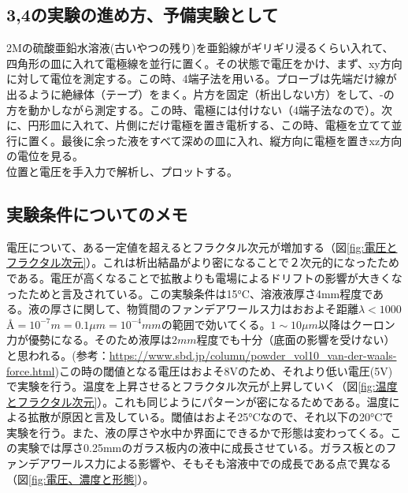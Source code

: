 \documentclass{ltjsarticle}
\begin{document}
\subsection{3,4の実験の進め方、予備実験として}
2Mの硫酸亜鉛水溶液(古いやつの残り)を亜鉛線がギリギリ浸るくらい入れて、四角形の皿に入れて電極線を並行に置く。その状態で電圧をかけ、まず、xy方向に対して電位を測定する。この時、4端子法を用いる。プローブは先端だけ線が出るように絶縁体（テープ）をまく。片方を固定（析出しない方）をして、-の方を動かしながら測定する。この時、電極には付けない（4端子法なので）。次に、円形皿に入れて、片側にだけ電極を置き電析する、この時、電極を立てて並行に置く。最後に余った液をすべて深めの皿に入れ、縦方向に電極を置きxz方向の電位を見る。\\
位置と電圧を手入力で解析し、プロットする。

\subsection{実験条件についてのメモ}
電圧について、ある一定値を超えるとフラクタル次元が増加する（図\ref{fig:電圧とフラクタル次元}）。これは析出結晶がより密になることで２次元的になったためである\cite{matsushita1984fractal}。電圧が高くなることで拡散よりも電場によるドリフトの影響が大きくなったためと言及されている。この実験条件は15\si{\degreeCelsius}、溶液液厚さ4\si{mm}程度である。液の厚さに関して、物質間のファンデアワールス力はおおよそ距離$\lambda<1000$ \AA $=10^{-7}\si{m}=0.1\si{\mu m}=10^{-4}\si{mm}$の範囲で効いてくる。$1\sim10\si{\mu m}$以降はクーロン力が優勢になる。そのため液厚は$2\si{mm}$程度でも十分（底面の影響を受けない）と思われる\cite{表面張力の物理学}。(参考：\url{https://www.sbd.jp/column/powder_vol10_van-der-waals-force.html})この時の閾値となる電圧はおよそ8Vのため、それより{\color{blue}低い電圧(5V)}で実験を行う。温度を上昇させるとフラクタル次元が上昇していく\cite{suda2003temperature}（図\ref{fig:温度とフラクタル次元}）。これも同じようにパターンが密になるためである。温度による拡散が原因と言及している。閾値はおよそ25\si{\degreeCelsius}なので、それ以下の{\color{blue}20\si{\degreeCelsius}}で実験を行う。また、液の厚さや水中か界面にできるかで形態は変わってくる\cite{sawada1986dendritic}。この実験では厚さ0.25\si{mm}のガラス板内の液中に成長させている。ガラス板とのファンデアワールス力による影響や、そもそも溶液中での成長である点で異なる（図\ref{fig:電圧、濃度と形態}）。
\end{document}
